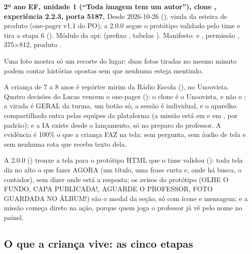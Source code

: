 \textbf{2º ano EF, unidade 1 (\enquote{Toda imagem tem um autor}), clone
, experiência 2.2.3, porta 5187.} Desde 2026-10-26
(), vinda da esteira de produto (one-pager v1.1 do PO); a 2.0.0
segue o protótipo validado pelo time e tira a etapa 6 (). Módulo
da api:  (prefixo , tabelas
). Manifesto:  e , permissão
, 375$\times$812, produto .

\begin{destaque}
Uma foto mostra só um recorte do lugar; duas fotos tiradas no mesmo minuto
podem contar histórias opostas sem que nenhuma esteja mentindo.
\end{destaque}

A criança de 7 a 8 anos é repórter mirim da Rádio Escola
(), no Unoovista. Quatro decisões do Lucas vencem o
one-pager (): o clone é o Unoovista, e não o ;
a virada é GERAL da turma, um botão só; a sessão é individual, e o aparelho
compartilhado entra pelas equipes da plataforma (a missão está em
 e em ,
 por padrão); e a IA existe desde o lançamento, só no preparo
do professor. A evidência é 100\% o que a criança FAZ na tela: sem pergunta,
sem áudio de tela e sem nenhuma rota que receba texto dela.

A 2.0.0 () trouxe a tela para o protótipo HTML que o time
validou (): toda tela diz no
alto o que fazer AGORA (um título, uma frase curta e, onde há busca, o
contador), sem dizer onde está a resposta; os avisos do protótipo (OLHE O
FUNDO, CAPA PUBLICADA!, AGUARDE O PROFESSOR, FOTO GUARDADA NO ÁLBUM!) são o
 modal da seção, só com ícone e mensagem; e a missão começa
direto na ação, porque quem joga o professor já vê pelo nome no painel.

\subsection{O que a criança vive: as cinco etapas}

